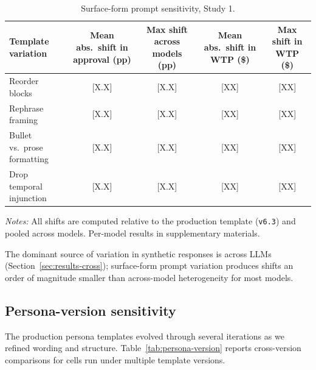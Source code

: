 \documentclass[12pt]{article}
\begin{document}
\begin{table}[h]
    \centering
    \caption{Surface-form prompt sensitivity, Study 1.}
    \label{tab:prompt-sensitivity}
    \begin{threeparttable}
    \begin{tabular}{lcccc}
        \toprule
        Template variation & Mean abs.\ shift in approval (pp) & Max shift across models (pp) & Mean abs.\ shift in WTP (\$) & Max shift in WTP (\$) \\
        \midrule
        Reorder blocks                  & [X.X] & [X.X] & [XX] & [XX] \\
        Rephrase framing                & [X.X] & [X.X] & [XX] & [XX] \\
        Bullet vs.\ prose formatting    & [X.X] & [X.X] & [XX] & [XX] \\
        Drop temporal injunction        & [X.X] & [X.X] & [XX] & [XX] \\
        \bottomrule
    \end{tabular}
    \begin{tablenotes}\footnotesize
        \item \textit{Notes:} All shifts are computed relative to the production template (\texttt{v6.3}) and pooled across models. Per-model results in supplementary materials.
    \end{tablenotes}
    \end{threeparttable}
\end{table}

The dominant source of variation in synthetic responses is across LLMs (Section~\ref{sec:results-cross}); surface-form prompt variation produces shifts an order of magnitude smaller than across-model heterogeneity for most models.

\subsection{Persona-version sensitivity}

The production persona templates evolved through several iterations as we refined wording and structure. Table~\ref{tab:persona-version} reports cross-version comparisons for cells run under multiple template versions.
\end{document}
